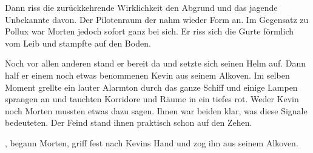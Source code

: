 \par

Dann riss die zurückkehrende Wirklichkeit den Abgrund und das jagende Unbekannte davon. Der Pilotenraum der  nahm wieder Form an. Im Gegensatz zu Pollux war Morten jedoch sofort ganz bei sich. Er riss sich die Gurte förmlich vom Leib und stampfte auf den Boden.

\par

Noch vor allen anderen stand er bereit da und setzte sich seinen Helm auf. Dann half er einem noch etwas benommenen Kevin aus seinem Alkoven. Im selben Moment grellte ein lauter Alarmton durch das ganze Schiff und einige Lampen sprangen an und tauchten Korridore und Räume in ein tiefes rot. Weder Kevin noch Morten mussten etwas dazu sagen. Ihnen war beiden klar, was diese Signale bedeuteten. Der Feind stand ihnen praktisch schon auf den Zehen.

\par

, begann Morten, griff fest nach Kevins Hand und zog ihn aus seinem Alkoven. 